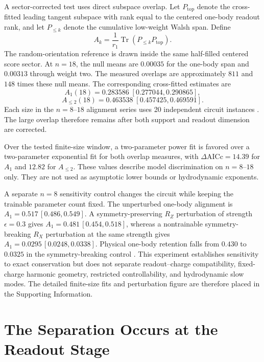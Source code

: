 A sector-corrected test uses direct subspace overlap. Let $P_{\mathrm{top}}$ denote the cross-fitted leading tangent subspace with rank equal to the centered one-body readout rank, and let $P_{\le k}$ denote the cumulative low-weight Walsh span. Define
\begin{equation}
 A_k=\frac{1}{r_1}\operatorname{Tr}(P_{\le k}P_{\mathrm{top}}).
\label{eq:aqt-Ak}
\end{equation}
The random-orientation reference is drawn inside the same half-filled centered score sector. At $n=18$, the null means are $0.00035$ for the one-body span and $0.00313$ through weight two. The measured overlaps are approximately $811$ and $148$ times these null means. The corresponding cross-fitted estimates are
\begin{equation}
 A_1(18)=0.283586\;[0.277044,0.290865],
\end{equation}
\begin{equation}
 A_{\le2}(18)=0.463538\;[0.457425,0.469591].
\end{equation}
Each size in the $n=8$--$18$ alignment series uses 20 independent circuit instances \cite{AitHaddou2026MeasurementAccessible}. The large overlap therefore remains after both support and readout dimension are corrected.

Over the tested finite-size window, a two-parameter power fit is favored over a two-parameter exponential fit for both overlap measures, with $\Delta\mathrm{AICc}=14.39$ for $A_1$ and $12.82$ for $A_{\le2}$. These values describe model discrimination on $n=8$--$18$ only. They are not used as asymptotic lower bounds or hydrodynamic exponents.

A separate $n=8$ sensitivity control changes the circuit while keeping the trainable parameter count fixed. The unperturbed one-body alignment is $A_1=0.517\,[0.486,0.549]$. A symmetry-preserving $R_Z$ perturbation of strength $\epsilon=0.3$ gives $A_1=0.481\,[0.454,0.518]$, whereas a nontrainable symmetry-breaking $R_X$ perturbation at the same strength gives $A_1=0.0295\,[0.0248,0.0338]$. Physical one-body retention falls from $0.430$ to $0.0325$ in the symmetry-breaking control \cite{AitHaddou2026MeasurementAccessible}. This experiment establishes sensitivity to exact conservation but does not separate readout--charge compatibility, fixed-charge harmonic geometry, restricted controllability, and hydrodynamic slow modes. The detailed finite-size fits and perturbation figure are therefore placed in the Supporting Information.

\section{The Separation Occurs at the Readout Stage}

